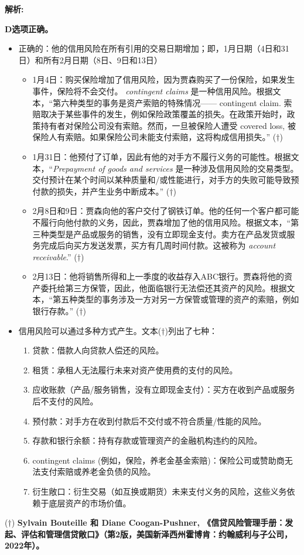 \documentclass{article}
\newenvironment{explanation}
{\textbf{解析:}\par}
{\par}
\begin{document}
  \begin{explanation}
      \textbf{D选项正确。} 
      \begin{itemize}
          \item 正确的：他的信用风险在所有引用的交易日期增加；即，1月日期（4日和31日）和所有2月日期（8日、9日和13日）
      \begin{itemize}
          \item 1月4日：购买保险增加了信用风险，因为贾森购买了一份保险，如果发生事件，保险将不会交付。\textit{ contingent claims} 是一种信用风险。根据文本，“第六种类型的事务是资产索赔的特殊情况—— contingent claim. 索赔取决于某些事件的发生，例如保险政策覆盖的损失。在政策开始时，政策持有者对保险公司没有索赔。然而，一旦被保险人遭受 covered loss, 被保险人有索赔。如果保险公司未能支付索赔，这将构成信用损失。” ($\dagger$)
          \item 1月31日：他预付了订单，因此有他的对手方不履行义务的可能性。根据文本，“\textit{Prepayment of goods and services} 是一种涉及信用风险的交易类型。交付预计在某个时间以某种质量和/或性能进行，对手方的失败可能导致预付款的损失，并产生业务中断成本。” ($\dagger$)
          \item 2月8日和9日：贾森向他的客户交付了钢铁订单。他的任何一个客户都可能不履行向他付款的义务，因此，贾森增加了他的信用风险。根据文本，“第三种类型是产品或服务的销售，没有立即现金支付。卖方在产品发货或服务完成后向买方发送发票，买方有几周时间付款。这被称为 \textit{account receivable}.” ($\dagger$)
          \item 2月13日：他将销售所得和上一季度的收益存入ABC银行。贾森将他的资产委托给第三方保管，因此，他面临银行无法偿还其资产的风险。根据文本，“第五种类型的事务涉及一方对另一方保管或管理的资产的索赔，例如银行存款。” ($\dagger$)
      \end{itemize}
   
      \item 信用风险可以通过多种方式产生。文本($\dagger$)列出了七种：
      \begin{enumerate}
          \item 贷款：借款人向贷款人偿还的风险。
          \item 租赁：承租人无法履行未来对资产使用费的支付的风险。
          \item 应收账款（产品/服务销售，没有立即现金支付）：买方在收到产品或服务后不支付的风险。
          \item 预付款：对手方在收到付款后不交付或不符合质量/性能的风险。
          \item 存款和银行余额：持有存款或管理资产的金融机构违约的风险。
          \item  contingent claims (例如，保险，养老金基金索赔)：保险公司或赞助商无法支付索赔或养老金负债的风险。
          \item 衍生敞口：衍生交易（如互换或期货）未来支付义务的风险，这些义务依赖于底层资产的市场价值。
      \end{enumerate}
    \end{itemize}
      ($\dagger$) \textbf{Sylvain Bouteille 和 Diane Coogan-Pushner, 《信贷风险管理手册：发起、评估和管理信贷敞口》（第2版，美国新泽西州霍博肯：约翰威利与子公司，2022年）。}
  \end{explanation}
  
\end{document}
